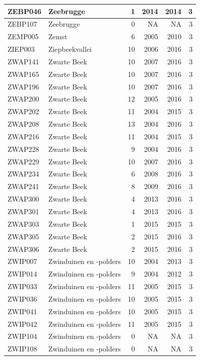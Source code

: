 \documentclass[11pt,]{book}
\begin{document}
\begin{table}
\begin{tabular}[t]{l|l|r|r|r|r}
\hline
ZEBP046 & Zeebrugge & 1 & 2014 & 2014 & 3\\
\hline
ZEBP107 & Zeebrugge & 0 & NA & NA & 3\\
\hline
ZEMP005 & Zemst & 6 & 2005 & 2010 & 3\\
\hline
ZIEP003 & Ziepbeekvallei & 10 & 2006 & 2016 & 3\\
\hline
ZWAP141 & Zwarte Beek & 10 & 2007 & 2016 & 3\\
\hline
ZWAP165 & Zwarte Beek & 10 & 2007 & 2016 & 3\\
\hline
ZWAP196 & Zwarte Beek & 10 & 2007 & 2016 & 3\\
\hline
ZWAP200 & Zwarte Beek & 12 & 2005 & 2016 & 3\\
\hline
ZWAP202 & Zwarte Beek & 11 & 2004 & 2015 & 3\\
\hline
ZWAP208 & Zwarte Beek & 13 & 2004 & 2016 & 3\\
\hline
ZWAP216 & Zwarte Beek & 11 & 2004 & 2015 & 3\\
\hline
ZWAP228 & Zwarte Beek & 9 & 2004 & 2016 & 3\\
\hline
ZWAP229 & Zwarte Beek & 10 & 2007 & 2016 & 3\\
\hline
ZWAP234 & Zwarte Beek & 6 & 2008 & 2016 & 3\\
\hline
ZWAP241 & Zwarte Beek & 8 & 2009 & 2016 & 3\\
\hline
ZWAP300 & Zwarte Beek & 4 & 2013 & 2016 & 3\\
\hline
ZWAP301 & Zwarte Beek & 4 & 2013 & 2016 & 3\\
\hline
ZWAP303 & Zwarte Beek & 1 & 2015 & 2015 & 3\\
\hline
ZWAP305 & Zwarte Beek & 2 & 2015 & 2016 & 3\\
\hline
ZWAP306 & Zwarte Beek & 2 & 2015 & 2016 & 3\\
\hline
ZWIP007 & Zwinduinen en -polders & 10 & 2004 & 2013 & 3\\
\hline
ZWIP014 & Zwinduinen en -polders & 9 & 2004 & 2012 & 3\\
\hline
ZWIP033 & Zwinduinen en -polders & 11 & 2005 & 2015 & 3\\
\hline
ZWIP036 & Zwinduinen en -polders & 10 & 2005 & 2015 & 3\\
\hline
ZWIP041 & Zwinduinen en -polders & 10 & 2005 & 2015 & 3\\
\hline
ZWIP042 & Zwinduinen en -polders & 11 & 2005 & 2015 & 3\\
\hline
ZWIP104 & Zwinduinen en -polders & 0 & NA & NA & 3\\
\hline
ZWIP108 & Zwinduinen en -polders & 0 & NA & NA & 3\\

\end{tabular}
\end{table}
\end{document}
